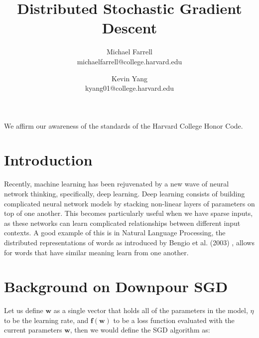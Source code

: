 \documentclass[11pt]{article}
\title{Distributed Stochastic Gradient Descent}
\author{Michael Farrell \\ michaelfarrell@college.harvard.edu \and Kevin Yang \\ kyang01@college.harvard.edu }
\begin{document}
\maketitle{}



\noindent We affirm our awareness of the standards of the Harvard College Honor Code.

\section{Introduction}

Recently, machine learning has been rejuvenated by a new wave of neural network thinking, specifically, deep learning. Deep learning consists of building complicated neural network models by stacking non-linear layers of parameters on top of one another. This becomes particularly useful when we have sparse inputs, as these networks can learn complicated relationships between different input contexts. A good example of this is in Natural Language Processing, the distributed representations of words as introduced by Bengio et al. (2003) \cite{bengio-emb},  allows for words that have similar meaning learn from one another. \\


\section {Background on Downpour SGD}

Let us define $\mathbf w$ as a single vector that holds all of the parameters in the model, $\eta$ to be the learning rate, and $\mathbf f(\mathbf w)$ to be a loss function evaluated with the current parameters $\mathbf w$, then we would define the SGD algorithm as:
 
\end{document}
